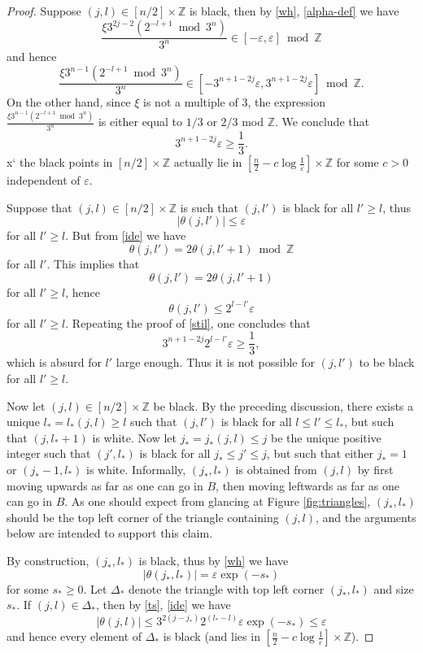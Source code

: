 \documentclass[12pt,a4paper,reqno]{amsart}
\numberwithin{equation}{section}
\theoremstyle{plain}
\theoremstyle{definition}
\newcommand\Z{\mathbb{Z}}
\newcommand\eps{\varepsilon}
\renewcommand{\mod}{\bmod}
\begin{document}
\begin{proof}  Suppose $(j,l) \in [n/2] \times \Z$ is black, then by \eqref{wh}, \eqref{alpha-def} we have
$$ \frac{\xi 3^{2j-2} (2^{-l+1} \mod 3^n)}{3^n} \in [-\eps, \eps] \mod \Z$$
and hence
$$
 \frac{\xi 3^{n-1} (2^{-l+1} \mod 3^n)}{3^n} \in [-3^{n+1-2j} \eps, 3^{n+1-2j}\eps] \mod \Z.
$$
On the other hand, since $\xi$ is not a multiple of $3$, the expression $\frac{\xi 3^{n-1} (2^{-l+1} \mod 3^n)}{3^n}$ is either equal to $1/3$ or $2/3$ mod $\Z$.  We conclude that 
\begin{equation}\label{stil}
3^{n+1-2j}\eps \geq \frac{1}{3}.  
\end{equation}	
x` the black points in $[n/2] \times \Z$ actually lie in $[\frac{n}{2} - c \log \frac{1}{\eps}] \times \Z$ for some $c>0$ independent of $\eps$.

Suppose that $(j,l) \in [n/2] \times \Z$ is such that $(j,l')$ is black for all $l' \geq l$, thus
$$ |\theta(j,l')| \leq \eps$$
for all $l' \geq l$.  But from \eqref{ide} we have
$$ \theta(j,l') = 2 \theta(j,l'+1) \mod \Z$$
for all $l'$.  This implies that
$$ \theta(j,l') = 2 \theta(j,l'+1)$$
for all $l' \geq l$, hence
$$ \theta(j,l') \leq 2^{l-l'} \eps$$
for all $l' \geq l$.  Repeating the proof of \eqref{stil}, one concludes that
$$ 3^{n+1-2j} 2^{l-l'} \eps \geq \frac{1}{3},$$
which is absurd for $l'$ large enough.  Thus it is not possible for $(j,l')$ to be black for all $l' \geq l$.

Now let $(j,l) \in [n/2] \times \Z$ be black.  By the preceding discussion, there exists a unique $l_* = l_*(j,l) \geq l$ such that $(j,l')$ is black for all $l \leq l' \leq l_*$, but such that $(j,l_*+1)$ is white.  Now let $j_* = j_*(j,l) \leq j$ be the unique positive integer such that $(j',l_*)$ is black for all $j_* \leq j' \leq j$, but such that either $j_*=1$ or $(j_*-1,l_*)$ is white.  Informally, $(j_*,l_*)$ is obtained from $(j,l)$ by first moving upwards as far as one can go in $B$, then moving leftwards as far as one can go in $B$.  As one should expect from glancing at Figure \ref{fig:triangles}, $(j_*,l_*)$ should be the top left corner of the triangle containing $(j,l)$, and the arguments below are intended to support this claim.

By construction, $(j_*,l_*)$ is black, thus by \eqref{wh} we have
\begin{equation}\label{ap}
|\theta(j_*,l_*)| = \eps \exp(-s_*)
\end{equation}
for some $s_* \geq 0$. Let $\Delta_*$ denote the triangle with top left corner $(j_*,l_*)$ and size $s_*$.  If $(j,l) \in \Delta_*$, then by \eqref{ts}, \eqref{ide} we have
$$ |\theta(j,l)| \leq 3^{2(j-j_*)} 2^{(l_*-l)} \eps \exp(-s_*) \leq \eps$$
and hence every element of $\Delta_*$ is black (and lies in $[\frac{n}{2} - c \log \frac{1}{\eps}] \times \Z$).  


\end{proof}
\end{document}
